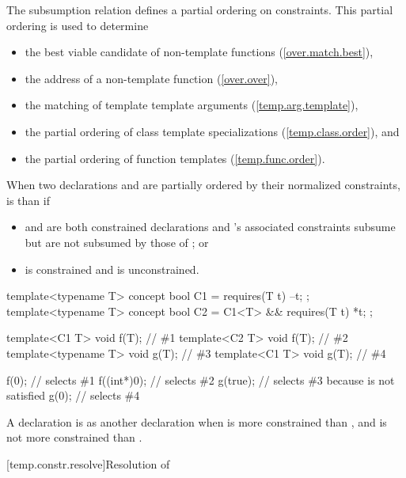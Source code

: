 \pnum
The subsumption relation defines a partial ordering on constraints. 
This partial ordering is used to determine
% 
\begin{itemize}
\item the best viable candidate of non-template functions
     (\ref{over.match.best}), 
\item the address of a non-template function
     (\ref{over.over}), 
\item the matching of template template arguments
     (\ref{temp.arg.template}), 
\item the partial ordering of class template specializations
     (\ref{temp.class.order}), and
\item the partial ordering of function templates
     (\ref{temp.func.order}).
\end{itemize}

\pnum
When two declarations  and  are
partially ordered by their normalized constraints,  is 
 than  if
% 
\begin{itemize}
\item {} and  are both constrained
declarations and 's associated constraints subsume but 
are not subsumed by those of ; or

\item {} is constrained and  is
unconstrained. 
\end{itemize}
% 
\enterexample
\begin{codeblock}
template<typename T> concept bool C1 = requires(T t) { --t; };
template<typename T> concept bool C2 = C1<T> && requires(T t) { *t; };

template<C1 T> void f(T);       // \#1
template<C2 T> void f(T);       // \#2
template<typename T> void g(T); // \#3
template<C1 T> void g(T);       // \#4

f(0);       // selects \#1
f((int*)0); // selects \#2
g(true);    // selects \#3 because  is not satisfied
g(0);       // selects \#4
\end{codeblock}
\exitexample

\pnum
A declaration  is 
as another declaration  when  is more
constrained than , and  is not more
constrained than .


[temp.constr.resolve]{Resolution of }

